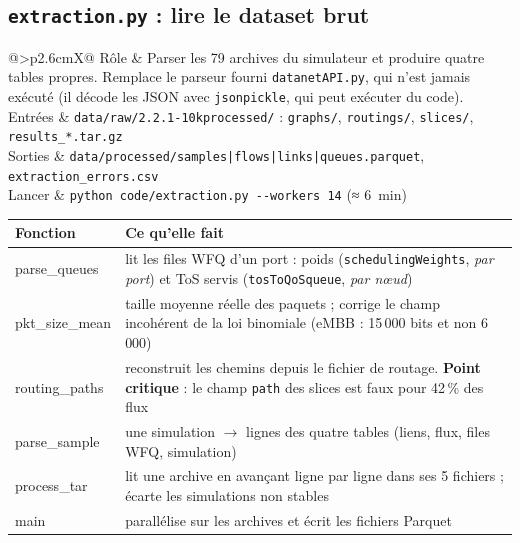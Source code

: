 \documentclass[11pt,a4paper]{article}
\makeatletter
\newcommand{\f}[1]{\texttt{#1}}
\newcommand{\fiche}[4]{%
\noindent\begin{tabularx}{\linewidth}{@{}>{\bfseries}p{2.6cm}X@{}}
\toprule
Rôle & #1\\
Entrées & #2\\
Sorties & #3\\
Lancer & #4\\
\bottomrule
\end{tabularx}\par\medskip}
\makeatother
\begin{document}
\subsection{\texttt{extraction.py} : lire le dataset brut}
\fiche{Parser les 79 archives du simulateur et produire quatre tables propres. Remplace le parseur fourni \f{datanetAPI.py}, qui n'est jamais exécuté (il décode les JSON avec \f{jsonpickle}, qui peut exécuter du code).}
{\f{data/raw/2.2.1-10kprocessed/} : \f{graphs/}, \f{routings/}, \f{slices/}, \f{results\_*.tar.gz}}
{\f{data/processed/samples|flows|links|queues.parquet}, \f{extraction\_errors.csv}}
{\f{python code/extraction.py -{}-workers 14} (≈ 6~min)}
\begin{tabularx}{\linewidth}{@{}>{\ttfamily}p{3.6cm}X@{}}
\toprule
\normalfont\bfseries Fonction & \bfseries Ce qu'elle fait\\
\midrule
parse\_queues & lit les files WFQ d'un port : poids (\f{schedulingWeights}, \emph{par port}) et ToS servis (\f{tosToQoSqueue}, \emph{par nœud})\\
pkt\_size\_mean & taille moyenne réelle des paquets ; corrige le champ incohérent de la loi binomiale (eMBB : 15\,000 bits et non 6\,000)\\
routing\_paths & reconstruit les chemins depuis le fichier de routage. \textbf{Point critique} : le champ \f{path} des slices est faux pour 42\,\% des flux\\
parse\_sample & une simulation $\to$ lignes des quatre tables (liens, flux, files WFQ, simulation)\\
process\_tar & lit une archive en avançant ligne par ligne dans ses 5 fichiers ; écarte les simulations non stables\\
main & parallélise sur les archives et écrit les fichiers Parquet\\
\bottomrule
\end{tabularx}
\end{document}
